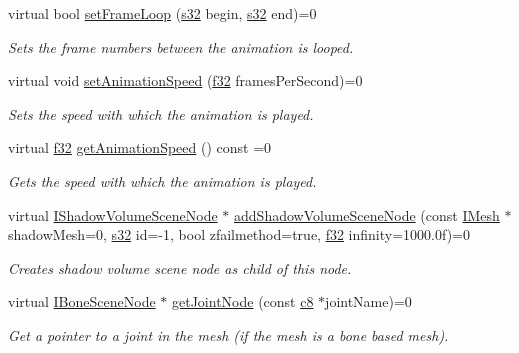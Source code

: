 \begin{DoxyCompactItemize}
virtual bool \hyperlink{classirr_1_1scene_1_1IAnimatedMeshSceneNode_a900400fe375ca13f48876b84900ffddf}{set\+Frame\+Loop} (\hyperlink{namespaceirr_ac66849b7a6ed16e30ebede579f9b47c6}{s32} begin, \hyperlink{namespaceirr_ac66849b7a6ed16e30ebede579f9b47c6}{s32} end)=0
\begin{DoxyCompactList}\small\item\em Sets the frame numbers between the animation is looped. \end{DoxyCompactList}\item 
virtual void \hyperlink{classirr_1_1scene_1_1IAnimatedMeshSceneNode_a89ef2d20c6e9e83fdb861403c9698c4a}{set\+Animation\+Speed} (\hyperlink{namespaceirr_a0277be98d67dc26ff93b1a6a1d086b07}{f32} frames\+Per\+Second)=0
\begin{DoxyCompactList}\small\item\em Sets the speed with which the animation is played. \end{DoxyCompactList}\item 
virtual \hyperlink{namespaceirr_a0277be98d67dc26ff93b1a6a1d086b07}{f32} \hyperlink{classirr_1_1scene_1_1IAnimatedMeshSceneNode_a246c21ec2ae5b3a5cecc10f9cc3625c4}{get\+Animation\+Speed} () const =0
\begin{DoxyCompactList}\small\item\em Gets the speed with which the animation is played. \end{DoxyCompactList}\item 
virtual \hyperlink{classirr_1_1scene_1_1IShadowVolumeSceneNode}{I\+Shadow\+Volume\+Scene\+Node} $\ast$ \hyperlink{classirr_1_1scene_1_1IAnimatedMeshSceneNode_aaa4947ed5f7ba72870da37ee1fc17125}{add\+Shadow\+Volume\+Scene\+Node} (const \hyperlink{classirr_1_1scene_1_1IMesh}{I\+Mesh} $\ast$shadow\+Mesh=0, \hyperlink{namespaceirr_ac66849b7a6ed16e30ebede579f9b47c6}{s32} id=-\/1, bool zfailmethod=true, \hyperlink{namespaceirr_a0277be98d67dc26ff93b1a6a1d086b07}{f32} infinity=1000.\+0f)=0
\begin{DoxyCompactList}\small\item\em Creates shadow volume scene node as child of this node. \end{DoxyCompactList}\item 
virtual \hyperlink{classirr_1_1scene_1_1IBoneSceneNode}{I\+Bone\+Scene\+Node} $\ast$ \hyperlink{classirr_1_1scene_1_1IAnimatedMeshSceneNode_ac7b64a5ddbe5d570dc5276b894a63619}{get\+Joint\+Node} (const \hyperlink{namespaceirr_a9395eaea339bcb546b319e9c96bf7410}{c8} $\ast$joint\+Name)=0
\begin{DoxyCompactList}\small\item\em Get a pointer to a joint in the mesh (if the mesh is a bone based mesh). \end{DoxyCompactList}\item 

\end{DoxyCompactItemize}
